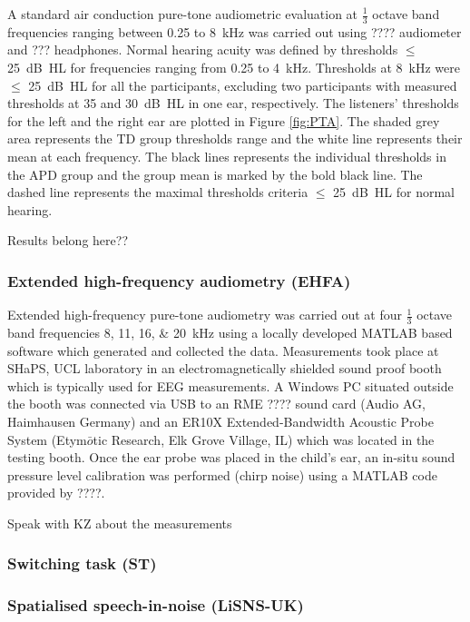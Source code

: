 \documentclass[a4paper,nobind]{templates/ociamthesis}
\begin{document}
A standard air conduction pure-tone audiometric evaluation at \(\frac{1}{3}\) octave band frequencies ranging between 0.25 to 8~kHz was carried out using ???? audiometer and ??? headphones. Normal hearing acuity was defined by thresholds \(\leq\) 25~dB~HL for frequencies ranging from 0.25 to 4~kHz. Thresholds at 8~kHz were \(\leq\) 25~dB~HL for all the participants, excluding two participants with measured thresholds at 35 and 30~dB~HL in one ear, respectively. The listeners' thresholds for the left and the right ear are plotted in Figure \ref{fig:PTA}. The shaded grey area represents the TD group thresholds range and the white line represents their mean at each frequency. The black lines represents the individual thresholds in the APD group and the group mean is marked by the bold black line. The dashed line represents the maximal thresholds criteria \(\leq\) 25~dB~HL for normal hearing.

{Results belong here??}

\hypertarget{extended-high-frequency-audiometry-ehfa}{%
\subsubsection{Extended high-frequency audiometry (EHFA)}\label{extended-high-frequency-audiometry-ehfa}}

Extended high-frequency pure-tone audiometry was carried out at four \(\frac{1}{3}\) octave band frequencies 8, 11, 16, \& 20~kHz using a locally developed MATLAB based software which generated and collected the data. Measurements took place at SHaPS, UCL laboratory in an electromagnetically shielded sound proof booth which is typically used for EEG measurements. A Windows PC situated outside the booth was connected via USB to an RME ???? sound card (Audio AG, Haimhausen Germany) and an ER10X Extended-Bandwidth Acoustic Probe System (Etym\(\bar{o}\)tic Research, Elk Grove Village, IL) which was located in the testing booth. Once the ear probe was placed in the child's ear, an in-situ sound pressure level calibration was performed (chirp noise) using a MATLAB code provided by ????.

Speak with KZ about the measurements

\hypertarget{switching-task-st}{%
\subsubsection{Switching task (ST)}\label{switching-task-st}}

\hypertarget{spatialised-speech-in-noise-lisns-uk}{%
\subsubsection{Spatialised speech-in-noise (LiSNS-UK)}\label{spatialised-speech-in-noise-lisns-uk}}
\end{document}
